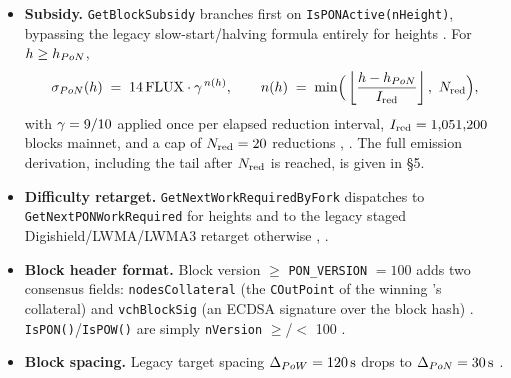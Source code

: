 \begin{itemize}
\item \textbf{Subsidy.} \texttt{Get\allowbreak{}Block\allowbreak{}Subsidy} branches first on \texttt{Is\allowbreak{}PONActive(n\allowbreak{}Height)},
bypassing the legacy slow-start/halving formula entirely for \PoN heights
\shipped {}. For $h \ge h_{PoN}$,
\[
\subsidypon(\hgt) \;=\; 14\flux \cdot \redfac^{\,n(\hgt)}, \qquad
n(\hgt) \;=\; \min\!\Big(\floorfrac{\hgt - \hpon}{\redint},\ \redmax\Big),
\]
with $\gamma = 9/10$ applied once per elapsed reduction interval, $I_{\mathrm{red}} = 1{,}051{,}200$ blocks
mainnet, and a cap of $N_{\mathrm{red}} = 20$ reductions
\shipped {}, . The full
emission derivation, including the tail after $N_{\mathrm{red}}$ is reached, is given in \S5.

\item \textbf{Difficulty retarget.} \texttt{Get\allowbreak{}Next\allowbreak{}Work\allowbreak{}Required\allowbreak{}By\allowbreak{}Fork} dispatches to
\texttt{Get\allowbreak{}Next\allowbreak{}PONWork\allowbreak{}Required} for \PoN heights and to the legacy staged
Digishield/LWMA/LWMA3 retarget otherwise
\shipped {}, .

\item \textbf{Block header format.} Block version $\ge$ \texttt{PON\_VERSION} $= 100$
\shipped {} adds two consensus fields:
\texttt{nodes\allowbreak{}Collateral} (the \texttt{COutPoint} of the winning \FluxNode's collateral) and
\texttt{vchBlockSig} (an ECDSA signature over the block hash)
\shipped {}. \texttt{IsPON()}\slash\texttt{IsPOW()} are
simply \texttt{nVersion} $\ge$/$<$ 100 \shipped {}.

\item \textbf{Block spacing.} Legacy target spacing $\Delta_{PoW} = 120\,\mathrm{s}$
\shipped {} drops to $\Delta_{PoN} = 30\,\mathrm{s}$
\shipped {}.


\end{itemize}
